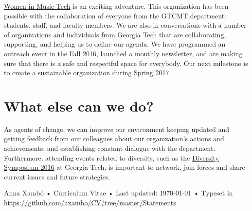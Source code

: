 \documentclass[10pt, a4paper]{article}
\begin{document}
\href{http://www.gtcmt.gatech.edu/womeninmusictech}{Women in Music Tech} is an exciting adventure. This organization has been possible with the collaboration of everyone from the GTCMT department: students, staff, and faculty members. We are also in conversations with a number of organizations and individuals from Georgia Tech that are collaborating, supporting, and helping us to define our agenda. We have programmed an outreach event in the Fall 2016, launched a monthly newsletter, and are making sure that there is a safe and respectful space for everybody. Our next milestone is to create a sustainable organization during Spring 2017.

\section*{What else can we do?}

As agents of change, we can improve our environment keeping updated and getting feedback from our colleagues about our organization's actions and achievements, and establishing constant dialogue with the department. Furthermore, attending events related to diversity, such as the \href{http://www.diversity.gatech.edu/diversitysymposium}{Diversity Symposium 2016} at Georgia Tech, is important to network, join forces and share current issues and future strategies.

\vfill{}

\begin{center}
{\scriptsize  Anna Xambó •\- Curriculum Vitae •\- Last updated: \today\- •\- %
Typeset in \href{http://nitens.org/taraborelli/cvtex}{
\XeTeX }\\
\href{https://github.com/axambo/CV/tree/master/Statements}{https://github.com/axambo/CV/tree/master/Statements}}
\end{center}
\end{document}

